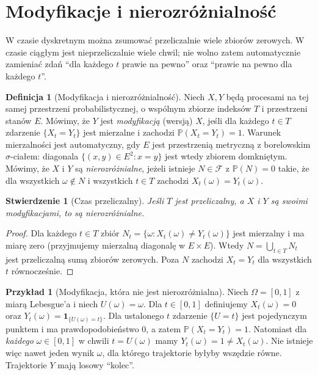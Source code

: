 \documentclass[11pt,a4paper,oneside]{report}
\numberwithin{equation}{chapter}
\theoremstyle{plain}
\newtheorem{stwierdzenie}[twierdzenie]{Stwierdzenie}
\theoremstyle{definition}
\newtheorem{definicja}{Definicja}[chapter]
\newtheorem{przyklad}{Przykład}[chapter]
\theoremstyle{remark}
\newcommand{\Prob}{\mathbb{P}}
\newcommand{\calF}{\mathcal{F}}
\newcommand{\ind}[1]{\mathbf{1}_{#1}}
\begin{document}
\section{Modyfikacje i nierozróżnialność}
W czasie dyskretnym można zsumować przeliczalnie wiele zbiorów
zerowych. W czasie ciągłym jest nieprzeliczalnie wiele chwil;
nie wolno zatem automatycznie zamieniać zdań ``dla każdego $t$
prawie na pewno'' oraz ``prawie na pewno dla każdego $t$''.

\begin{definicja}[Modyfikacja i nierozróżnialność]
Niech $X,Y$ będą procesami na tej samej przestrzeni probabilistycznej,
o wspólnym zbiorze indeksów $T$ i przestrzeni stanów $E$.
Mówimy, że $Y$ jest \emph{modyfikacją} (wersją) $X$, jeśli
dla każdego $t\in T$ zdarzenie $\{X_t=Y_t\}$ jest mierzalne
i zachodzi $\Prob(X_t=Y_t)=1$.
Warunek mierzalności jest automatyczny, gdy $E$ jest przestrzenią
metryczną z borelowskim $\sigma$-ciałem: diagonala
$\{(x,y)\in E^2:x=y\}$ jest wtedy zbiorem domkniętym.
Mówimy, że $X$ i $Y$ są \emph{nierozróżnialne}, jeżeli istnieje
$N\in\calF$ z $\Prob(N)=0$ takie, że dla wszystkich
$\omega\notin N$ i wszystkich $t\in T$ zachodzi
$X_t(\omega)=Y_t(\omega)$.
\end{definicja}

\begin{stwierdzenie}[Czas przeliczalny]
Jeśli $T$ jest przeliczalny, a $X$ i $Y$ są swoimi
modyfikacjami, to są nierozróżnialne.
\end{stwierdzenie}
\begin{proof}
Dla każdego $t\in T$ zbiór
$N_t=\{\omega:X_t(\omega)\ne Y_t(\omega)\}$ jest mierzalny
i ma miarę zero (przyjmujemy mierzalną diagonalę w $E\times E$).
Wtedy $N=\bigcup_{t\in T}N_t$ jest przeliczalną sumą
zbiorów zerowych. Poza $N$ zachodzi $X_t=Y_t$ dla
wszystkich $t$ równocześnie.
\end{proof}

\begin{przyklad}[Modyfikacja, która nie jest nierozróżnialna]
Niech $\Omega=[0,1]$ z miarą Lebesgue'a i niech
$U(\omega)=\omega$. Dla $t\in[0,1]$ definiujemy
$X_t(\omega)=0$ oraz $Y_t(\omega)=\ind{\{U(\omega)=t\}}$.
Dla ustalonego $t$ zdarzenie $\{U=t\}$ jest pojedynczym
punktem i ma prawdopodobieństwo $0$, a zatem
$\Prob(X_t=Y_t)=1$. Natomiast dla \emph{każdego}
$\omega\in[0,1]$ w chwili $t=U(\omega)$ mamy
$Y_t(\omega)=1\ne X_t(\omega)$. Nie istnieje więc
nawet jeden wynik $\omega$, dla którego trajektorie byłyby
wszędzie równe. Trajektorie $Y$ mają losowy ``kolec''.
\end{przyklad}
\end{document}
